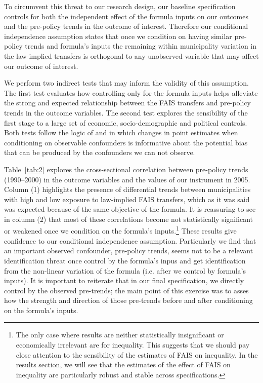\documentclass[dv_diss_main.tex]{subfiles}
\begin{document}
To circumvent this threat to our research design, our baseline specification controls for both the independent effect of the formula inputs on our outcomes and the pre-policy trends in the outcome of interest. Therefore our conditional independence assumption states that once we condition on having similar pre-policy trends and formula's inputs the remaining within municipality variation in the law-implied transfers is orthogonal to any unobserved variable that may affect our outcome of interest.

We perform two indirect tests that may inform the validity of this assumption. The first test evaluates how controlling only for the formula inputs helps alleviate the strong and expected relationship between the FAIS transfers and pre-policy trends in the outcome variables. The second test explores the sensibility of the first stage to a large set of economic, socio-demographic and political controls. Both tests follow the logic of \cite{altonji2005selection} and \cite{oster2019unobservable} in which changes in point estimates when conditioning on observable confounders is informative about the potential bias that can be produced by the confounders we can not observe.  


{Table}~\ref{tab:2} explores the cross-sectional correlation between pre-policy trends (1990–2000) in the outcome variables and the values of our instrument in 2005. Column (1) highlights the presence of differential trends between municipalities with high and low exposure to law-implied FAIS transfers, which as it was said was expected because of the same objective of the formula. It is reassuring to see in column (2) that most of these correlations become not statistically significant or weakened once we condition on the formula's inputs.\footnote{ The only case where results are neither statistically insignificant or economically irrelevant are for inequality. This suggests that we should pay close attention to the sensibility of the estimates of FAIS on inequality. In the results section, we will see that the estimates of the effect of FAIS on inequality are particularly robust and stable across specifications.} 
These results give confidence to our conditional independence assumption. Particularly we find that an important observed confounder, pre-policy trends, seems not to be a relevant identification threat once control by the formula's inpus and get identification from the non-linear variation of the formula (i.e. after we control by formula's inputs). It is important to reiterate that in our final specification, we directly control by the observed pre-trends; the main point of this exercise was to asses how the strength and direction of those pre-trends before and after conditioning on the formula's inputs. 
\end{document}
